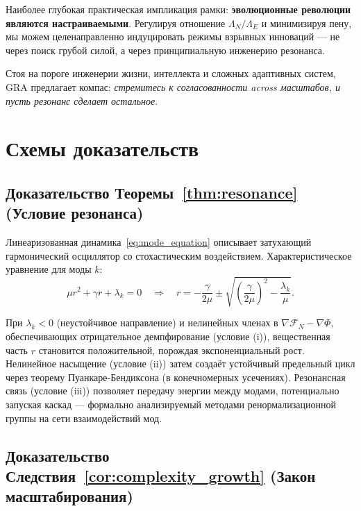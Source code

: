 \documentclass[11pt,a4paper]{article}
\theoremstyle{plain}
\theoremstyle{definition}
\theoremstyle{remark}
\newcommand{\Foam}{\Phi}
\newcommand{\Functional}{\mathcal{F}}
\newcommand{\grad}{\nabla}
\begin{document}
Наиболее глубокая практическая импликация рамки: \textbf{эволюционные революции являются настраиваемыми}. Регулируя отношение $\Lambda_N/\Lambda_E$ и минимизируя пену, мы можем целенаправленно индуцировать режимы взрывных инноваций --- не через поиск грубой силой, а через принципиальную инженерию резонанса.

Стоя на пороге инженерии жизни, интеллекта и сложных адаптивных систем, GRA предлагает компас: \textit{стремитесь к согласованности across масштабов, и пусть резонанс сделает остальное}.

\appendix

\section{Схемы доказательств}
\label{app:proofs}

\subsection{Доказательство Теоремы~\ref{thm:resonance} (Условие резонанса)}

Линеаризованная динамика~\eqref{eq:mode_equation} описывает затухающий гармонический осциллятор со стохастическим воздействием. Характеристическое уравнение для моды $k$:
\[
\mu r^2 + \gamma r + \lambda_k = 0 \quad \Rightarrow \quad r = -\frac{\gamma}{2\mu} \pm \sqrt{\left(\frac{\gamma}{2\mu}\right)^2 - \frac{\lambda_k}{\mu}}.
\]

При $\lambda_k < 0$ (неустойчивое направление) и нелинейных членах в $\grad\Functional_N - \grad\Foam$, обеспечивающих отрицательное демпфирование (условие (i)), вещественная часть $r$ становится положительной, порождая экспоненциальный рост. Нелинейное насыщение (условие (ii)) затем создаёт устойчивый предельный цикл через теорему Пуанкаре-Бендиксона (в конечномерных усечениях). Резонансная связь (условие (iii)) позволяет передачу энергии между модами, потенциально запуская каскад --- формально анализируемый методами ренормализационной группы на сети взаимодействий мод.

\subsection{Доказательство Следствия~\ref{cor:complexity_growth} (Закон масштабирования)}
\end{document}
